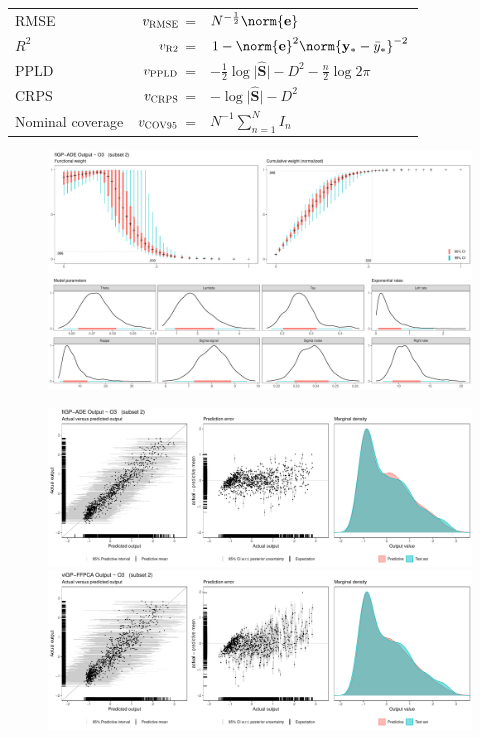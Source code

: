\documentclass[handout]{snedecorbeamer}
\begin{document}
\begin{frame}
  \begin{center}
    \begin{tabular}{lrl}
      RMSE
      & $v_{\textsc{RMSE}}$ =
      & $N^{-\frac{1}{2}} \norm{\mathbf{e}}$ \\
      $R^2$
      & $v_{\textsc{R2}} $ =
      & $1 -%
        \norm{\mathbf{e}}^{2}
        \norm{\mathbf{y}_* - \bar{y}_*}^{-2}$ \\
      PPLD
      & $v_{\textsc{PPLD}}$ =
      & $
        -\frac{1}{2} \log \lvert \hat{\mathbf{S}} \rvert
        -D^2
        -\frac{n}{2} \log 2 \pi
        $
      \\
      CRPS
      & $v_{\textsc{CRPS}}$ =
      & $
        -\log \lvert \hat{\mathbf{S}} \rvert%
        -D^2
        $
      \\
      Nominal coverage
      & $v_{\textsc{COV95}}$ =
      & $N^{-1} \sum_{n = 1}^{N} I_{n}$
    \end{tabular}
  \end{center}
\end{frame}

\begin{frame}[c]
  \begin{figure}
    \centering
    \includegraphics[width=.95\textwidth]{param-band2-unk-2-fiGP-ADE-1-O3.pdf}
  \end{figure}
\end{frame}

\begin{frame}[c]
  \begin{figure}
    \centering
    \includegraphics[width=.75\textwidth]{pred-band2-unk-2-fiGP-ADE-1-O3.pdf}
    \includegraphics[width=.75\textwidth]{pred-band2-unk-2-viGP-FFPCA-1-O3.pdf}
  \end{figure}
\end{frame}
\end{document}
